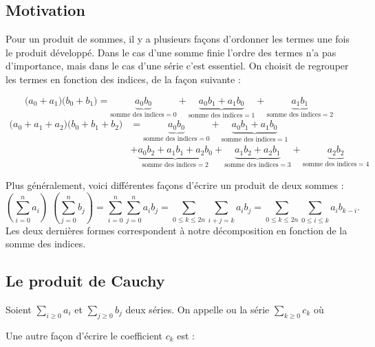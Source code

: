 \documentclass[class=report,crop=false]{standalone}
\begin{document}
\subsection{Motivation}

Pour un produit de sommes, il y a plusieurs façons d'ordonner les termes 
une fois le produit développé. Dans le cas d'une somme finie l'ordre des termes n'a pas d'importance, 
mais dans le cas d'une série c'est essentiel.
On choisit de regrouper les termes en fonction des indices, de la façon suivante :

$$\big(a_0+a_1\big)\big(b_0+b_1\big)=
\underbrace{a_0b_0}_{\text{somme des indices}=0}
+\underbrace{a_0b_1 + a_1b_0}_{\text{somme des indices}=1}
+\underbrace{a_1b_1}_{\text{somme des indices}=2}$$
\begin{align*}
\big(a_0+a_1+a_2\big)\big(b_0+b_1+b_2\big) & =
\underbrace{a_0b_0}_{\text{somme des indices}=0}
+\underbrace{a_0b_1 + a_1b_0}_{\text{somme des indices}=1} \\
& +\underbrace{a_0b_2+a_1b_1+a_2b_0}_{\text{somme des indices}=2}
+\underbrace{a_1b_2+a_2b_1}_{\text{somme des indices}=3}
+\underbrace{a_2b_2}_{\text{somme des indices}=4}  
\end{align*}




Plus généralement, voici différentes façons d'écrire un produit de deux sommes :
$$\left(\sum_{i=0}^n a_i\right)\; \left(\sum_{j=0}^n b_j\right)= 
\sum_{i=0}^n \sum_{j=0}^n a_ib_j
= \sum_{0 \le k \le 2n} \sum_{i+j=k} a_ib_j
= \sum_{0 \le k \le 2n} \sum_{0 \le i \le k} a_ib_{k-i}.$$
Les deux dernières formes correspondent à notre décomposition en fonction de la somme des indices.



\subsection{Le produit de Cauchy}


\begin{definition}
Soient $\sum_{i \ge 0} a_i$ et $\sum_{j \ge 0} b_j$ deux séries.
On appelle  ou 
la série $\sum_{k \ge 0} c_k$
o\`u  
\end{definition}

Une autre façon d'écrire le coefficient $c_k$ est :
\end{document}
